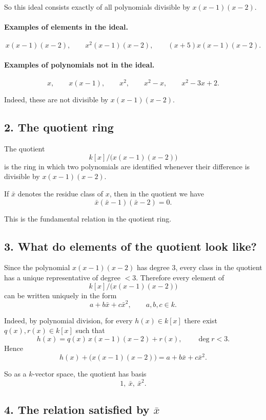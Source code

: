 \documentclass[12pt,a4paper]{article}
\theoremstyle{notespace}
\begin{document}
So this ideal consists exactly of all polynomials divisible by \(x(x-1)(x-2)\).

\paragraph{Examples of elements in the ideal.}
\[
x(x-1)(x-2),\qquad x^2(x-1)(x-2),\qquad (x+5)x(x-1)(x-2).
\]

\paragraph{Examples of polynomials not in the ideal.}
\[
x,\qquad x(x-1),\qquad x^2,\qquad x^2-x,\qquad x^2-3x+2.
\]

Indeed, these are not divisible by \(x(x-1)(x-2)\).

\subsection*{2. The quotient ring}

The quotient
\[
k[x]/\bigl(x(x-1)(x-2)\bigr)
\]
is the ring in which two polynomials are identified whenever their difference is divisible by \(x(x-1)(x-2)\).

If \(\bar x\) denotes the residue class of \(x\), then in the quotient we have
\[
\bar x(\bar x-1)(\bar x-2)=0.
\]

This is the fundamental relation in the quotient ring.

\subsection*{3. What do elements of the quotient look like?}

Since the polynomial \(x(x-1)(x-2)\) has degree \(3\), every class in the quotient has a unique representative of degree \(<3\). Therefore every element of
\[
k[x]/\bigl(x(x-1)(x-2)\bigr)
\]
can be written uniquely in the form
\[
a+b\bar x+c\bar x^2,
\qquad a,b,c\in k.
\]

Indeed, by polynomial division, for every \(h(x)\in k[x]\) there exist \(q(x),r(x)\in k[x]\) such that
\[
h(x)=q(x)\,x(x-1)(x-2)+r(x),
\qquad \deg r<3.
\]
Hence
\[
h(x)+\bigl(x(x-1)(x-2)\bigr)=a+b\bar x+c\bar x^2.
\]

So as a \(k\)-vector space, the quotient has basis
\[
1,\ \bar x,\ \bar x^2.
\]

\subsection*{4. The relation satisfied by \(\bar x\)}
\end{document}
